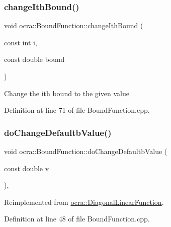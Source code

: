 \subsubsection{\texorpdfstring{change\+Ith\+Bound()}{changeIthBound()}}
{\footnotesize\ttfamily void ocra\+::\+Bound\+Function\+::change\+Ith\+Bound (\begin{DoxyParamCaption}\item[{const int}]{i,  }\item[{const double}]{bound }\end{DoxyParamCaption})}

Change the ith bound to the given value 

Definition at line 71 of file Bound\+Function.\+cpp.

\hypertarget{classocra_1_1BoundFunction_aa861028f4a37e45b4fc68b7852d7e451}{}\label{classocra_1_1BoundFunction_aa861028f4a37e45b4fc68b7852d7e451} 
\subsubsection{\texorpdfstring{do\+Change\+Defaultb\+Value()}{doChangeDefaultbValue()}}
{\footnotesize\ttfamily void ocra\+::\+Bound\+Function\+::do\+Change\+Defaultb\+Value (\begin{DoxyParamCaption}\item[{const double}]{v }\end{DoxyParamCaption})\hspace{0.3cm}{\ttfamily [protected]}, {\ttfamily [virtual]}}



Reimplemented from \hyperlink{classocra_1_1DiagonalLinearFunction_a9995af94055dc443c10018869a393635}{ocra\+::\+Diagonal\+Linear\+Function}.



Definition at line 48 of file Bound\+Function.\+cpp.

\hypertarget{classocra_1_1BoundFunction_af02c8fc499fb37596c758861d98cfbf6}{}\label{classocra_1_1BoundFunction_af02c8fc499fb37596c758861d98cfbf6} 
